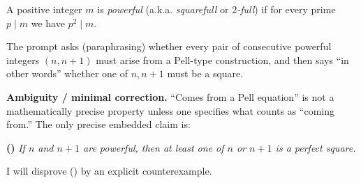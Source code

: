 A positive integer $m$ is \emph{powerful} (a.k.a. \emph{squarefull} or \emph{$2$-full}) if for every prime $p\mid m$ we have $p^2\mid m$.

The prompt asks (paraphrasing) whether every pair of consecutive powerful integers $(n,n+1)$ must arise from a Pell-type construction, and then says ``in other words'' whether one of $n,n+1$ must be a square.

\textbf{Ambiguity / minimal correction.} ``Comes from a Pell equation'' is not a mathematically precise property unless one specifies what counts as ``coming from.'' The only precise embedded claim is:

\medskip
\noindent\textbf{(\*)} \emph{If $n$ and $n+1$ are powerful, then at least one of $n$ or $n+1$ is a perfect square.}

I will disprove (\*) by an explicit counterexample.
